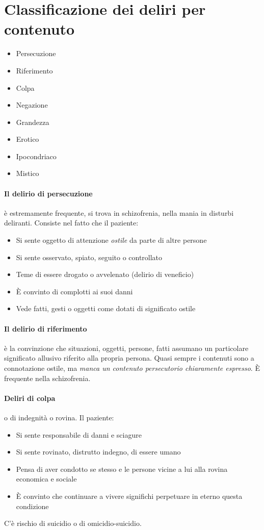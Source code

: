 {\section{Classificazione dei deliri per contenuto}
\begin{itemize}
	\item Persecuzione
	\item Riferimento
	\item Colpa
	\item Negazione
	\item Grandezza
	\item Erotico
	\item Ipocondriaco
	\item Mistico
\end{itemize}

\paragraph{Il delirio di persecuzione}  è estremamente frequente, si trova in schizofrenia, nella mania in disturbi deliranti. Consiste nel fatto che il paziente:
\begin{itemize}
	\item Si sente oggetto di attenzione \emph{ostile} da parte di altre persone
	\item Si sente osservato, spiato, seguito o controllato
	\item Teme di essere drogato o avvelenato (delirio di veneficio)
	\item È convinto di complotti ai suoi danni
	\item Vede fatti, gesti o oggetti come dotati di significato ostile
\end{itemize}
\paragraph{Il delirio di riferimento}  è la convinzione che situazioni, oggetti, persone, fatti assumano un particolare significato allusivo riferito alla propria persona. Quasi sempre i contenuti sono a connotazione ostile, ma \emph{manca un contenuto persecutorio chiaramente espresso}. È frequente nella schizofrenia.

\paragraph{Deliri di colpa}  o di indegnità o rovina. Il paziente:
\begin{itemize}
	\item Si sente responsabile di danni e sciagure
	\item Si sente rovinato, distrutto indegno, di essere umano
	\item Pensa di aver condotto se stesso e le persone vicine a lui alla rovina economica e sociale
	\item È convinto che continuare a vivere significhi perpetuare in eterno questa condizione
\end{itemize}
C'è rischio di suicidio o di omicidio-suicidio.

}
